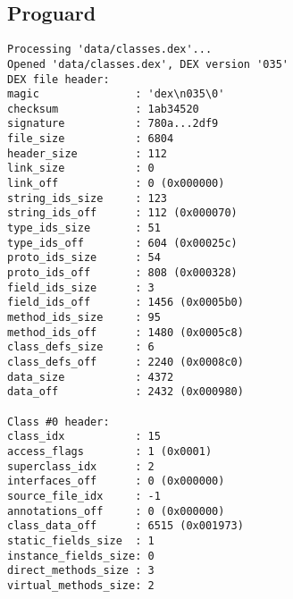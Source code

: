 \subsection{Proguard}
\label{app:dpa}
\begin{lstlisting}
Processing 'data/classes.dex'...
Opened 'data/classes.dex', DEX version '035'
DEX file header:
magic               : 'dex\n035\0'
checksum            : 1ab34520
signature           : 780a...2df9
file_size           : 6804
header_size         : 112
link_size           : 0
link_off            : 0 (0x000000)
string_ids_size     : 123
string_ids_off      : 112 (0x000070)
type_ids_size       : 51
type_ids_off        : 604 (0x00025c)
proto_ids_size      : 54
proto_ids_off       : 808 (0x000328)
field_ids_size      : 3
field_ids_off       : 1456 (0x0005b0)
method_ids_size     : 95
method_ids_off      : 1480 (0x0005c8)
class_defs_size     : 6
class_defs_off      : 2240 (0x0008c0)
data_size           : 4372
data_off            : 2432 (0x000980)

Class #0 header:
class_idx           : 15
access_flags        : 1 (0x0001)
superclass_idx      : 2
interfaces_off      : 0 (0x000000)
source_file_idx     : -1
annotations_off     : 0 (0x000000)
class_data_off      : 6515 (0x001973)
static_fields_size  : 1
instance_fields_size: 0
direct_methods_size : 3
virtual_methods_size: 2


\end{lstlisting}
